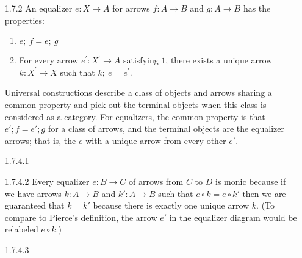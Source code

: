 \documentclass{article}
\begin{document}
\begin{enumerate}
\item[1.7.2]
  An equalizer $e : X \rightarrow A$ for arrows $f: A \rightarrow B$ and $g: A \rightarrow B$ has the properties:

  \begin{enumerate}
  \item $e;\ f = e;\ g$
  \item For every arrow $e^\prime: X^\prime \rightarrow A$ satisfying $1$, there exists a unique arrow $k: X^\prime \rightarrow X$ such that $k;\ e = e^\prime$.
  \end{enumerate}

  Universal constructions describe a class of objects and arrows sharing a common property and pick out the terminal objects when this class is considered as a category.
  For equalizers, the common property is that $e'; f = e'; g$ for a class of arrows, and the terminal objects are the equalizer arrows; that is, the $e$ with a unique arrow from every other $e'$.

\item[]
\item[1.7.4.1]
  

\item[]
\item[1.7.4.2]
  Every equalizer $e : B \rightarrow C$ of arrows from $C$ to $D$ is monic because if we have arrows $k : A \rightarrow B$ and $k' : A \rightarrow B$ such that $e \circ k = e \circ k'$ then we are guaranteed that $k = k'$ because there is exactly one unique arrow $k$.
  (To compare to Pierce's definition, the arrow $e'$ in the equalizer diagram would be relabeled $e \circ k$.)
  
\item[]
\item[1.7.4.3]
  
\end{enumerate}
\end{document}
